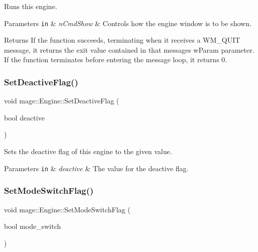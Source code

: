Runs this engine.


\begin{DoxyParams}[1]{Parameters}
\mbox{\tt in}  & {\em n\+Cmd\+Show} & Controls how the engine window is to be shown. \\
\hline
\end{DoxyParams}
\begin{DoxyReturn}{Returns}
If the function succeeds, terminating when it receives a {\ttfamily W\+M\+\_\+\+Q\+U\+IT} message, it returns the exit value contained in that message\textquotesingle{}s {\ttfamily w\+Param} parameter. If the function terminates before entering the message loop, it returns 0. 
\end{DoxyReturn}
\hypertarget{classmage_1_1_engine_a942bfa9892fa79bb1068d7c7ec4e6732}{}\label{classmage_1_1_engine_a942bfa9892fa79bb1068d7c7ec4e6732} 
\subsubsection{\texorpdfstring{Set\+Deactive\+Flag()}{SetDeactiveFlag()}}
{\footnotesize\ttfamily void mage\+::\+Engine\+::\+Set\+Deactive\+Flag (\begin{DoxyParamCaption}\item[{bool}]{deactive }\end{DoxyParamCaption})}

Sets the deactive flag of this engine to the given value.


\begin{DoxyParams}[1]{Parameters}
\mbox{\tt in}  & {\em deactive} & The value for the deactive flag. \\
\hline
\end{DoxyParams}
\hypertarget{classmage_1_1_engine_a5609c1700971f83bcf5b3259f7fea604}{}\label{classmage_1_1_engine_a5609c1700971f83bcf5b3259f7fea604} 
\subsubsection{\texorpdfstring{Set\+Mode\+Switch\+Flag()}{SetModeSwitchFlag()}}
{\footnotesize\ttfamily void mage\+::\+Engine\+::\+Set\+Mode\+Switch\+Flag (\begin{DoxyParamCaption}\item[{bool}]{mode\+\_\+switch }\end{DoxyParamCaption})\hspace{0.3cm}{\ttfamily [noexcept]}}

